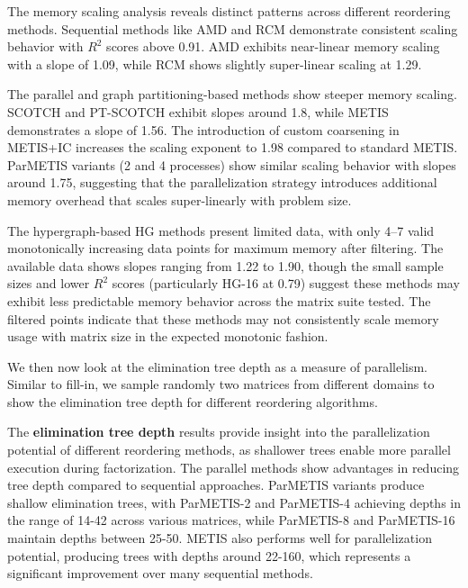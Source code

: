 The memory scaling analysis reveals distinct patterns across different reordering methods. Sequential methods like AMD and RCM demonstrate consistent scaling behavior with $R^2$ scores above 0.91. AMD exhibits near-linear memory scaling with a slope of 1.09, while RCM shows slightly super-linear scaling at 1.29.

The parallel and graph partitioning-based methods show steeper memory scaling. SCOTCH and PT-SCOTCH exhibit slopes around 1.8, while METIS demonstrates a slope of 1.56. The introduction of custom coarsening in METIS+IC increases the scaling exponent to 1.98 compared to standard METIS. ParMETIS variants (2 and 4 processes) show similar scaling behavior with slopes around 1.75, suggesting that the parallelization strategy introduces additional memory overhead that scales super-linearly with problem size.

The hypergraph-based HG methods present limited data, with only 4--7 valid monotonically increasing data points for maximum memory after filtering. The available data shows slopes ranging from 1.22 to 1.90, though the small sample sizes and lower $R^2$ scores (particularly HG-16 at 0.79) suggest these methods may exhibit less predictable memory behavior across the matrix suite tested. The filtered points indicate that these methods may not consistently scale memory usage with matrix size in the expected monotonic fashion.

We then now look at the elimination tree depth as a measure of parallelism. Similar to fill-in, we sample randomly two matrices from different domains to show the elimination tree depth for different reordering algorithms.

The \textbf{elimination tree depth} results provide insight into the parallelization potential of different reordering methods, as shallower trees enable more parallel execution during factorization. The parallel methods show advantages in reducing tree depth compared to sequential approaches. ParMETIS variants produce shallow elimination trees, with ParMETIS-2 and ParMETIS-4 achieving depths in the range of 14-42 across various matrices, while ParMETIS-8 and ParMETIS-16 maintain depths between 25-50. METIS also performs well for parallelization potential, producing trees with depths around 22-160, which represents a significant improvement over many sequential methods.

